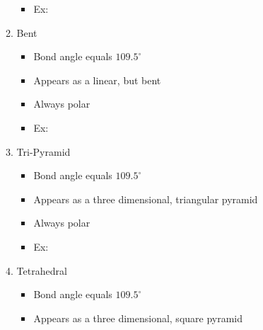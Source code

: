 \documentclass[12pt]{article}
\begin{document}
\begin{itemize}
\begin{enumerate}
\begin{itemize}
          \item Ex:

            \vspace{5pt}

        \end{itemize}

      \item Bent

        \begin{itemize}

          \item Bond angle equals $109.5^{\circ}$

          \item Appears as a linear, but bent

          \item Always polar

          \item Ex:


        \end{itemize}

      \item Tri-Pyramid

        \begin{itemize}

          \item Bond angle equals $109.5^{\circ}$

          \item Appears as a three dimensional, triangular pyramid

          \item Always polar

          \item Ex:


        \end{itemize}

      \item Tetrahedral

        \begin{itemize}

          \item Bond angle equals $109.5^{\circ}$

          \item Appears as a three dimensional, square pyramid


\end{itemize}
\end{enumerate}
\end{itemize}
\end{document}
